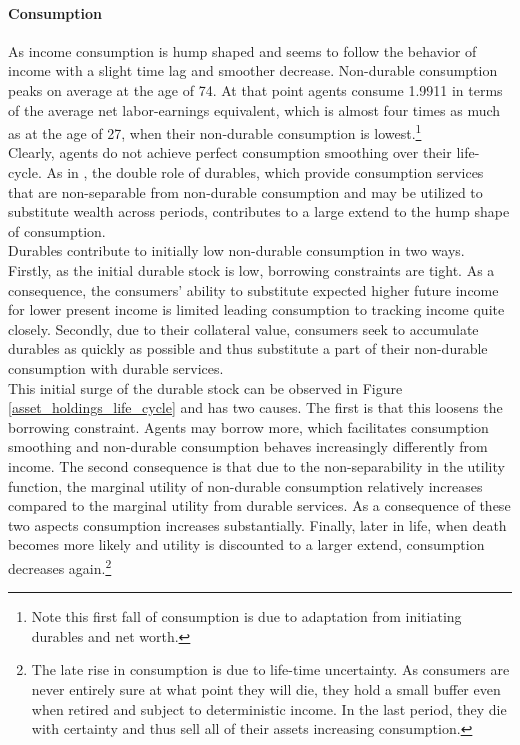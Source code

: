 \documentclass[a4paper,12pt,legno]{article}
\begin{document}
\paragraph{Consumption} As income consumption is hump shaped and seems to follow the behavior of income with a slight time lag and smoother decrease. Non-durable consumption peaks on average at the age of 74. At that point agents consume 1.9911 in terms of the average net labor-earnings equivalent, which is almost four times as much as at the age of 27, when their non-durable consumption is lowest.\footnote{Note this first fall of consumption is due to adaptation from initiating durables and net worth.} \\
Clearly, agents do not achieve perfect consumption smoothing over their life-cycle. As in \cite{FV&K2011}, the double role of durables, which provide consumption services that are non-separable from non-durable consumption and may be utilized to substitute wealth across periods, contributes to a large extend to the hump shape of consumption.\\
Durables contribute to initially low non-durable consumption in two ways. Firstly, as the initial durable stock is low, borrowing constraints are tight. As a consequence, the consumers' ability to substitute expected higher future income for lower present income is limited leading consumption to tracking income quite closely. Secondly, 
due to their collateral value, consumers seek to accumulate durables as quickly as possible and thus substitute a part of their non-durable consumption with durable services. \\
This initial surge of the durable stock can be observed in Figure \ref{asset_holdings_life_cycle} and has two causes. The first is that this loosens the borrowing constraint. Agents may borrow more, which facilitates consumption smoothing and non-durable consumption behaves increasingly differently from income. The second consequence is that due to the non-separability in the utility function, the marginal utility of non-durable consumption relatively increases compared to the marginal utility from durable services. As a consequence of these two aspects consumption increases substantially. 
Finally, later in life, when death becomes more likely and utility is discounted to a larger extend, consumption decreases again.\footnote{The late rise in consumption is due to life-time uncertainty. As consumers are never entirely sure at what point they will die, they hold a small buffer even when retired and subject to deterministic income. In the last period, they die with certainty and thus sell all of their assets increasing consumption.} 
\end{document}
